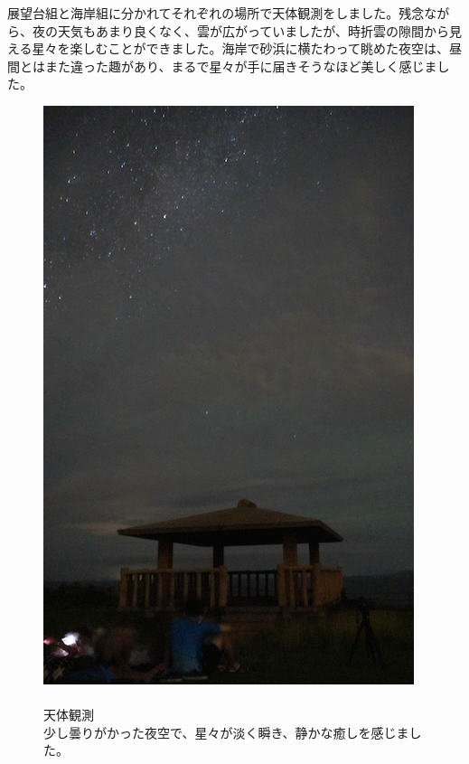 \documentclass[../main]{subfiles}
\begin{document}
展望台組と海岸組に分かれてそれぞれの場所で天体観測をしました。残念ながら、夜の天気もあまり良くなく、雲が広がっていましたが、時折雲の隙間から見える星々を楽しむことができました。海岸で砂浜に横たわって眺めた夜空は、昼間とはまた違った趣があり、まるで星々が手に届きそうなほど美しく感じました。
\begin{figure}[H]
  \begin{minipage}[b]{0.58\columnwidth}
    \centering
    \includegraphics[width=\columnwidth]{figure/3nitimeyoru.jpg}
  \end{minipage}
  \hspace{0.04\columnwidth} %
  \begin{minipage}[b]{0.38\columnwidth}
    \caption{\\
    天体観測\\
    少し曇りがかった夜空で、星々が淡く瞬き、静かな癒しを感じました。
    }
  \end{minipage}
\end{figure}
\end{document}
